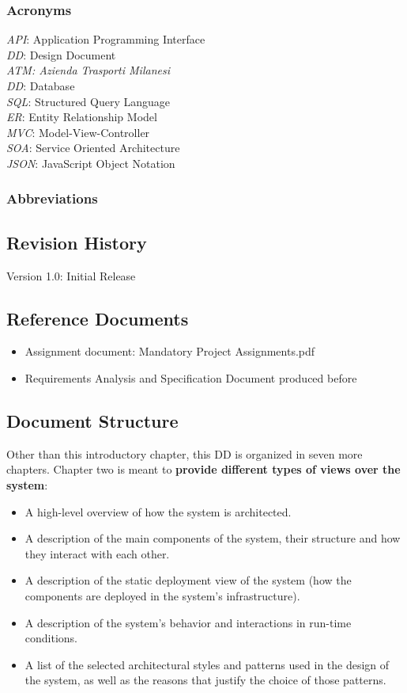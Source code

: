 \documentclass[12pt]{article}
\begin{document}
\subsubsection{Acronyms}
\textit{API}: Application Programming Interface\\
\textit{DD}: Design Document\\
\textit{ATM: Azienda Trasporti Milanesi}\\
\textit{DD}: Database\\
\textit{SQL}: Structured Query Language\\
\textit{ER}: Entity Relationship Model\\
\textit{MVC}: Model-View-Controller\\
\textit{SOA}: Service Oriented Architecture\\
\textit{JSON}: JavaScript Object Notation
\subsubsection{Abbreviations}


\subsection{Revision History}
Version 1.0: Initial Release

\subsection{Reference Documents}
\begin{itemize}
    \item Assignment document: Mandatory Project Assignments.pdf
    \item Requirements Analysis and Specification Document produced before
\end{itemize}


\subsection{Document Structure}

Other than this introductory chapter, this DD is organized in seven more chapters. Chapter two is meant to \textbf{provide different types of views over the system}:
\begin{itemize}
    \item A high-level overview of how the system is architected.
    \item A description of the main components of the system, their structure and how they interact with each other.
    \item A description of the static deployment view of the system (how the components are deployed in the system's infrastructure). 
    \item A description of the system's behavior and interactions in run-time conditions.
    \item A list of the selected architectural styles and patterns used in the design of the system, as well as the reasons that justify the choice of those patterns.
\end{itemize}
\end{document}
